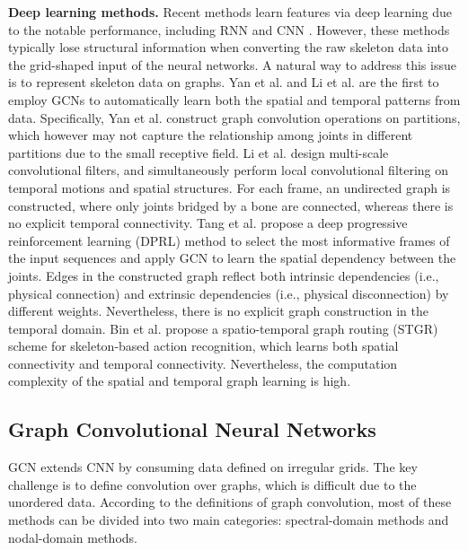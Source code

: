 \documentclass[conference]{IEEEtran}
\begin{document}
\textbf{Deep learning methods.} Recent methods learn features via deep learning due to the notable performance, including RNN \cite{Du15cvpr,liu16eccv,Shahroudy_2016_CVPR,Zhu16aaai,song2016aaai,zhang17,Li_2017_ICMEW,Tanfous_CVPR_2018,Liu_2018_TPAMI} and CNN \cite{Li_2017_ICMEW,li17,Ke17cvpr,kim2017interpretable,Liu17pr}. However, these methods typically lose structural information when converting the raw skeleton data into the grid-shaped input of the neural networks. A natural way to address this issue is to represent skeleton data on graphs. Yan et al. \cite{yan18} and Li et al. \cite{li18spatio} are the first to employ GCNs to automatically learn both the spatial and temporal patterns from data. Specifically, Yan et al. \cite{yan18} construct graph convolution operations on partitions, which however may not capture the relationship among joints in different partitions due to the small receptive field. Li et al. \cite{li18spatio} design multi-scale convolutional filters, and simultaneously perform local convolutional filtering on temporal motions and spatial structures. For each frame, an undirected graph is constructed, where only joints bridged by a bone are connected, whereas there is no explicit temporal connectivity. Tang et al. \cite{Tang_2018_CVPR} propose a deep progressive reinforcement learning (DPRL) method to select the most informative frames of the input sequences and apply GCN to learn the spatial dependency between the joints. Edges in the constructed graph reflect both intrinsic dependencies (i.e., physical connection) and extrinsic dependencies (i.e., physical disconnection) by different weights. Nevertheless, there is no explicit graph construction in the temporal domain. Bin et al. \cite{bi2019spatio} propose a spatio-temporal graph routing (STGR) scheme for skeleton-based action recognition, which learns both spatial connectivity and temporal connectivity. Nevertheless, the computation complexity of the spatial and temporal graph learning is high. 

\subsection{Graph Convolutional Neural Networks}
GCN extends CNN by consuming data defined on irregular grids. The key challenge is to define convolution over graphs, which is difficult due to the unordered data. According to the definitions of graph convolution, most of these methods can be divided into two main categories: spectral-domain methods and nodal-domain methods.   
\end{document}

